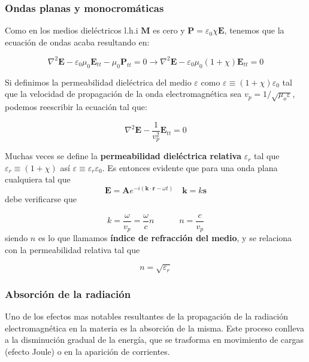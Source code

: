 \documentclass[12pt]{article}
\newcommand{\tquad}{\quad \quad \quad}
\newcommand{\En}{\mathbf{E}}
\newcommand{\kn}{\mathbf{k}}
\newcommand{\rn}{\mathbf{r}}
\newcommand{\An}{\mathbf{A}}
\newcommand{\Pn}{\mathbf{P}}
\newcommand{\Mn}{\mathbf{M}}
\newcommand{\sn}{\mathbf{s}}
\numberwithin{equation}{section}
\numberwithin{figure}{section}
\begin{document}
\subsubsection{Ondas planas y monocromáticas}

Como en los medios dieléctricos l.h.i $\Mn$ es cero y $\Pn = \varepsilon_0 \chi \En$, tenemos que la ecuación de ondas acaba resultando en:


\begin{equation}
\nabla^2 \En - \varepsilon_0 \mu_0 \En_{tt} - \mu_0 \Pn_{tt} = 0 \longrightarrow  \nabla^2 \En - \varepsilon_0 \mu_0 (1+\chi) \En_{tt} = 0
\end{equation}

Si definimos la permeabilidad dieléctrica del medio $\varepsilon$ como $\varepsilon  \equiv (1+\chi) \varepsilon_0$  tal que la velocidad de propagación de la onda electromagnética sea $v_p = 1/\sqrt{\mu_o \varepsilon}$, podemos reescribir la ecuación tal que:

\begin{equation}
\nabla^2 \En - \dfrac{1}{v^2_p} \En_{tt} = 0
\end{equation}

Muchas veces se define la \textbf{permeabilidad dieléctrica relativa} $\varepsilon_r$ tal que $\varepsilon_r \equiv (1+\chi)$ así $\varepsilon \equiv \varepsilon_r \varepsilon_0$. Es entonces evidente que para una onda plana cualquiera tal que $$\En = \An e^{-i (\kn \cdot \rn - \omega t)} \quad \kn = k \sn$$
debe verificarse que 

\begin{equation}
k = \dfrac{\omega}{v_p} = \dfrac{\omega}{c} n \tquad n = \dfrac{c}{v_p}
\end{equation}
siendo $n$ es lo que llamamos \textbf{índice de refracción del medio}, y se relaciona con la permeabilidad relativa tal que 

\begin{equation}
n = \sqrt{\varepsilon_r}
\end{equation}

\subsubsection{Absorción de la radiación}

Uno de los efectos mas notables resultantes de la propagación de la radiación electromagnética en la materia es la absorción de la misma. Este proceso conlleva a la disminución gradual de la energía, que se trasforma en movimiento de cargas (efecto Joule) o en la aparición de corrientes.  \\
\end{document}
